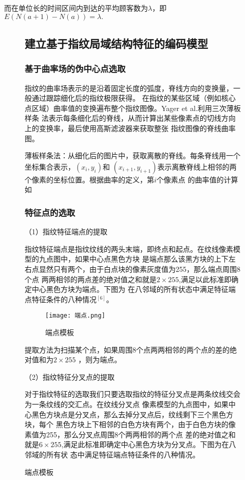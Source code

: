 \documentclass{whutmod}
\begin{document}
\begin{spacing}{1.2}
而在单位长的时间区间内到达的平均顾客数为$\lambda$，即$E(N(a+1)-N(a))=\lambda.$


\begin{figure}[H]

\subsection{建立基于指纹局域结构特征的编码模型}

\subsubsection{基于曲率场的伪中心点选取}
指纹的曲率场表示的是沿着固定长度的弧度，脊线方向的变换量，一般通过跟踪细化后的指纹极限获得。
在指纹的某些区域（例如核心点区域）曲率值的变换遍布整个指纹图像。Yager et al.利用三次薄板样条
法表示每条细化后的脊线，从而计算出某些像素点的切线方向上的变换率，最后使用高斯滤波器来获取整张
指纹图像的脊线曲率图。

薄板样条法：从细化后的图片中，获取离散的脊线。每条脊线用一个坐标集合表示，$(x_i,y_i)$和
$(x_{i+1},y_{i+1})$表示离散脊线上相邻的两个像素的坐标位置。根据曲率的定义，第$i$个像素点
的曲率值的计算如


\subsubsection{特征点的选取}
（1）指纹特征端点的提取

指纹特征端点是指纹纹线的两头末端，即终点和起点。在纹线像素模型的九点图中，如果中心点黑色方块
是端点那么该黑方块的上下左右点显然只有两个，由于白点块的像素灰度值为255，那么端点周围8个点
两两相邻的两点差的绝对值之和就是$2\times 255$,满足以此标准即确定中心黑色方块为端点。下图为
在八邻域的所有状态中满足特征端点特征条件的八种情况$^{[6]}$。
\begin{figure}[H]
	\centering
	\texttt{[image: 端点.png]}
	\caption{端点模板}
	\label{断电模板}
\end{figure}

提取方法为扫描某个点，如果周围8个点两两相邻的两个点的差的绝对值和为$2\times 255$
，则为端点。

（2）指纹特征分叉点的提取

对于指纹特征的选取我们只要选取指纹的特征分叉点是两条纹线交会为一条纹线的交汇点。在纹线分叉点
像素模型的九点图中，如果中心黑色方块点是分叉点，那么去掉分叉点后，纹线剩下三个黑色方块，每个
黑色方块上下相邻的白色方块有两个，由于白色方块的像素值为255，那么分叉点周围8个两两相邻的两个点
差的绝对值之和就是$6\times 255$,满足此标准即确定中心黑色方块为分叉点。下图为在八邻域的所有状
态中满足特征端点特征条件的八种情况。


\end{figure}
\end{spacing}
\end{document}

